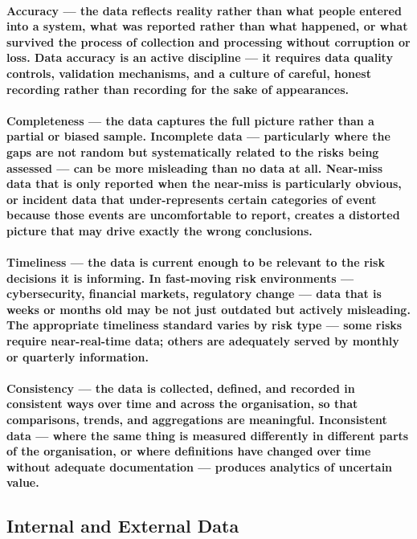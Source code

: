 \paragraph{\textbf{Accuracy} — the data reflects reality rather than what people entered into a system, what was reported rather than what happened, or what survived the process of collection and processing without corruption or loss. Data accuracy is an active discipline — it requires data quality controls, validation mechanisms, and a culture of careful, honest recording rather than recording for the sake of appearances.}
\paragraph{\textbf{Completeness} — the data captures the full picture rather than a partial or biased sample. Incomplete data — particularly where the gaps are not random but systematically related to the risks being assessed — can be more misleading than no data at all. Near-miss data that is only reported when the near-miss is particularly obvious, or incident data that under-represents certain categories of event because those events are uncomfortable to report, creates a distorted picture that may drive exactly the wrong conclusions.}
\paragraph{\textbf{Timeliness} — the data is current enough to be relevant to the risk decisions it is informing. In fast-moving risk environments — cybersecurity, financial markets, regulatory change — data that is weeks or months old may be not just outdated but actively misleading. The appropriate timeliness standard varies by risk type — some risks require near-real-time data; others are adequately served by monthly or quarterly information.}
\paragraph{\textbf{Consistency} — the data is collected, defined, and recorded in consistent ways over time and across the organisation, so that comparisons, trends, and aggregations are meaningful. Inconsistent data — where the same thing is measured differently in different parts of the organisation, or where definitions have changed over time without adequate documentation — produces analytics of uncertain value.}

\subsection{Internal and External Data}

